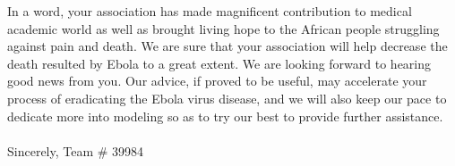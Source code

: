 \documentclass[12pt]{article}
\newcommand{\pagetop}{Team \# 39984} %
\begin{document}
    In a word, your association has made magnificent contribution to medical academic world as well as brought living hope to the African people struggling against pain and death. We are sure that your association will help decrease the death resulted by Ebola to a great extent. We are looking forward to hearing good news from you. Our advice, if proved to be useful, may accelerate your process of eradicating the Ebola virus disease, and we will also keep our pace to dedicate more into modeling so as to try our best to provide further assistance. 
\\    
\\   
Sincerely, \pagetop


\medskip


\end{document}
